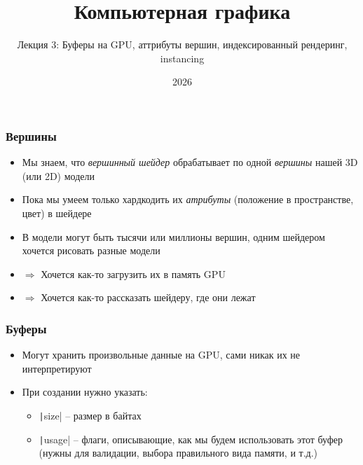 \documentclass[10pt]{beamer}
\title{Компьютерная графика}
\subtitle{Лекция 3: Буферы на GPU, аттрибуты вершин, индексированный рендеринг, instancing}
\date{2026}
\begin{document}
\frame{\titlepage}

\begin{frame}[fragile]
\frametitle{Вершины}
\begin{itemize}
\item Мы знаем, что \textit{вершинный шейдер} обрабатывает по одной \textit{вершины} нашей 3D (или 2D) модели
\pause
\item Пока мы умеем только хардкодить их \textit{атрибуты} (положение в пространстве, цвет) в шейдере
\pause
\item В модели могут быть тысячи или миллионы вершин, одним шейдером хочется рисовать разные модели
\pause
\item \(\Longrightarrow\) Хочется как-то загрузить их в память GPU
\pause
\item \(\Longrightarrow\) Хочется как-то рассказать шейдеру, где они лежат
\end{itemize}
\end{frame}

\begin{frame}[fragile]
\frametitle{Буферы}
\begin{itemize}
\item Могут хранить произвольные данные на GPU, сами никак их не интерпретируют
\pause
\item При создании нужно указать:
\pause
\begin{itemize}
\item \texttt|size| -- размер в байтах
\pause
\item \texttt|usage| -- флаги, описывающие, как мы будем использовать этот буфер (нужны для валидации, выбора правильного вида памяти, и т.д.)
\end{itemize}
\end{itemize}
\end{frame}
\end{document}

